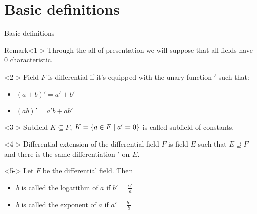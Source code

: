 \documentclass[8pt]{beamer}
\renewcommand{\|}{\ensuremath{\hspace{0.1cm} | \hspace{0.1cm}}}
\begin{document}
    \section{Basic definitions}
    \begin{frame}{Basic definitions}
        \begin{block}{Remark}<1->
            Through the all of presentation we will suppose that all fields have 0 characteristic.
        \end{block}
        \begin{definition}<2->
            Field $F$ is differential if it's equipped with the unary function $'$ such that:
            \begin{itemize}
                \item $(a+b)' = a' + b'$
                \item $(ab)' = a'b + ab'$
            \end{itemize}
        \end{definition}
        \begin{definition}<3->
            Subfield $K \subseteq F$, $K = \{ a \in F \| a' = 0 \}$ is called subfield of constants.
        \end{definition}
        \begin{definition}<4->
            Differential extension of the differential field $F$ is field $E$ such that $E \supseteq F$ and there is the same differentiation $'$ on $E$.
        \end{definition}
        \begin{definition}<5->
            Let $F$ be the differential field. Then
            \begin{itemize}
                \item $b$ is called the logarithm of $a$ if $b' = \frac{a'}{a}$
                \item $b$ is called the exponent of $a$ if $a' = \frac{b'}{b}$
            \end{itemize}
        \end{definition}
    \end{frame}
    
    
\end{document}
